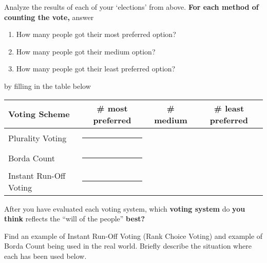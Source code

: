 \documentclass[nooutcomes,noauthor,hints,handout,12pt]{ximera}
\begin{document}
\begin{question}
  Analyze the results of each of your `elections' from above. \textbf{For each
  method of counting the vote,} answer
  \begin{enumerate}
  \item How many people got their most preferred option?
  \item How many people got their medium option? 
  \item How many people got their least preferred option?
  \end{enumerate}
  by filling in the table below
  \begin{center}\renewcommand{\arraystretch}{1.5}
    \begin{tabular}{|l||c|c|c|}\hline
      Voting Scheme & \# most preferred & \# medium & \# least preferred \\ \hline\hline
      Plurality  Voting &  \rule[7mm]{10mm}{0mm}& & \\ \hline
      Borda Count &  \rule[7mm]{10mm}{0mm}&  & \\ \hline
      Instant Run-Off Voting & \rule[7mm]{10mm}{0mm}&  &\\\hline
    \end{tabular}
  \end{center}
  
  After you have evaluated each voting system, which \textbf{voting system} do
  \textbf{you think} reflects the ``will of the people'' \textbf{best?}
\end{question}
\mynewpage








\begin{question}
  Find an example of Instant Run-Off Voting (Rank Choice Voting) and
  example of Borda Count being used in the real world. Briefly
  describe the situation where each has been used below.
    
\end{question}
\end{document}
